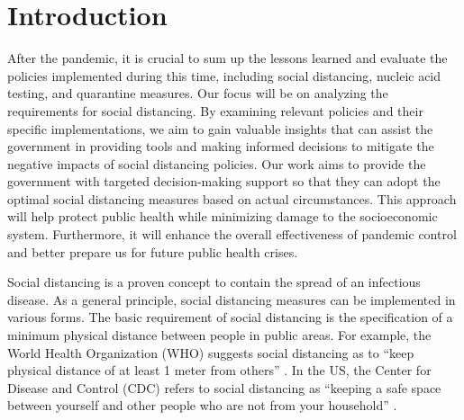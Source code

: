 \section{Introduction}




After the pandemic, it is crucial to sum up the lessons learned and evaluate the policies implemented during this time, including social distancing, nucleic acid testing, and quarantine measures. Our focus will be on analyzing the requirements for social distancing. By examining relevant policies and their specific implementations, we aim to gain valuable insights that can assist the government in providing tools and making informed decisions to mitigate the negative impacts of social distancing policies. Our work aims to provide the government with targeted decision-making support so that they can adopt the optimal social distancing measures based on actual circumstances. This approach will help protect public health while minimizing damage to the socioeconomic system. Furthermore, it will enhance the overall effectiveness of pandemic control and better prepare us for future public health crises.

Social distancing is a proven concept to contain the spread of an infectious disease. As a general principle, social distancing measures can be implemented in various forms. The basic requirement of social distancing is the specification of a minimum physical distance between people in public areas. For example, the World Health Organization (WHO) suggests social distancing as to ``keep physical distance of at least 1 meter from others'' \cite{AdviceforPublic}. In the US, the Center for Disease and Control (CDC) refers to social distancing as ``keeping a safe space between yourself and other people who are not from your household'' \cite{CDC}. 

